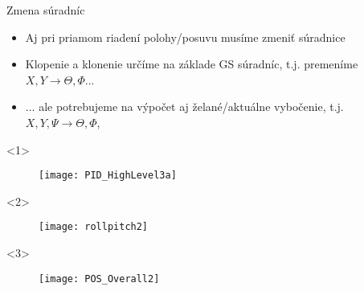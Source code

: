  \begin{frame}[t]{Zmena súradníc}
\begin{itemize}
  \item<1-> Aj pri priamom riadení polohy/posuvu musíme zmeniť súradnice
  \item<2-> Klopenie a klonenie určíme na základe GS súradníc, t.j. premeníme $X,Y\rightarrow\Theta,\Phi$...
  \item<3->  ...   ale potrebujeme na výpočet aj želané/aktuálne vybočenie, t.j. $X,Y,\Psi\rightarrow\Theta,\Phi$,
\end{itemize}

  \begin{onlyenv}<1>
  \begin{figure}
\centering
  \texttt{[image: PID\_HighLevel3a]}\\
\end{figure}
\end{onlyenv}

  \begin{onlyenv}<2>
  \begin{figure}
\centering
  \texttt{[image: rollpitch2]}\\
\end{figure}
\end{onlyenv}


  \begin{onlyenv}<3>
  \begin{figure}
\centering
  \texttt{[image: POS\_Overall2]}\\
\end{figure}
\end{onlyenv}
\end{frame}


